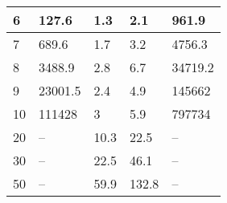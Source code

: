 \begin{table}[h]
\begin{tabular}{||l|llll||}
    6          & 127.6                                                             & 1.3                                                               & 2.1                                                                       & 961.9                                                                      \\ \hline
    7          & 689.6                                                             & 1.7                                                               & 3.2                                                                       & 4756.3                                                                     \\ \hline
    8          & 3488.9                                                            & 2.8                                                               & 6.7                                                                       & 34719.2                                                                    \\ \hline
    9          & 23001.5                                                           & 2.4                                                               & 4.9                                                                       & 145662                                                                     \\ \hline
    10         & 111428                                                            & 3                                                                 & 5.9                                                                       & 797734                                                                     \\ \hline
    20         & --                                                                & 10.3                                                              & 22.5                                                                      & --                                                                         \\ \hline
    30         & --                                                                & 22.5                                                              & 46.1                                                                      & --                                                                         \\ \hline
    50         & --                                                                & 59.9                                                              & 132.8                                                                     & --                                                                         \\ \hline

\end{tabular}
\end{table}
